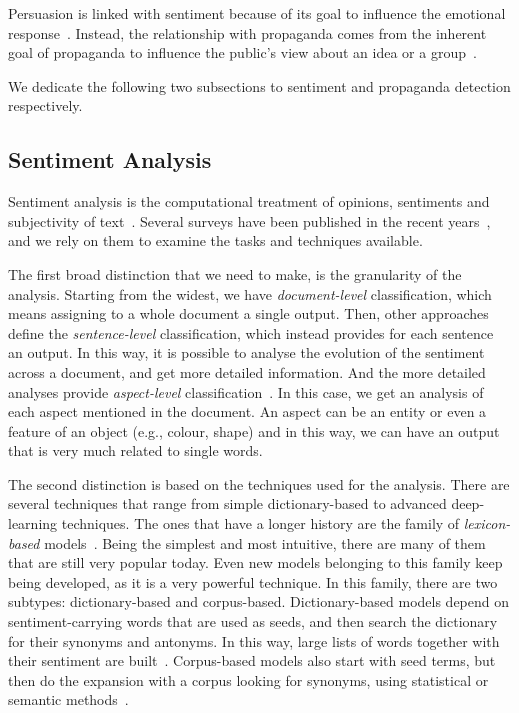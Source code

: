 Persuasion is linked with sentiment because of its goal to influence the emotional response~\citep{gatti2014sentiment,rocklage2018persuasion,petty2015emotion,desteno2004discrete}.
Instead, the relationship with propaganda comes from the inherent goal of propaganda to influence the public's view about an idea or a group~\citep{bernays,jowett2018propaganda}.

We dedicate the following two subsections to sentiment and propaganda detection respectively.

\subsection{\statusgreen Sentiment Analysis}
\label{sec:lit_sentiment}


Sentiment analysis is the computational treatment of opinions, sentiments and subjectivity of text~\citep{medhat2014sentiment}.
Several surveys have been published in the recent years~\citep{liu2010sentiment,medhat2014sentiment,wankhade2022survey}, and we rely on them to examine the tasks and techniques available.



The first broad distinction that we need to make, is the granularity of the analysis.
Starting from the widest, we have \emph{document-level} classification, which means assigning to a whole document a single output.
Then, other approaches define the \emph{sentence-level} classification, which instead provides for each sentence an output. In this way, it is possible to analyse the evolution of the sentiment across a document, and get more detailed information.
And the more detailed analyses provide \emph{aspect-level} classification~\citep{zhang2022survey}. In this case, we get an analysis of each aspect mentioned in the document. An aspect can be an entity or even a feature of an object (e.g., colour, shape) and in this way, we can have an output that is very much related to single words.

The second distinction is based on the techniques used for the analysis. There are several techniques that range from simple dictionary-based to advanced deep-learning techniques.
The ones that have a longer history are the family of \emph{lexicon-based} models~\citep{taboada2011lexicon}. Being the simplest and most intuitive, there are many of them that are still very popular today. Even new models belonging to this family keep being developed, as it is a very powerful technique.
In this family, there are two subtypes: dictionary-based and corpus-based.
Dictionary-based models depend on sentiment-carrying words that are used as seeds, and then search the dictionary for their synonyms and antonyms. In this way, large lists of words together with their sentiment are built~\citep{okango2022dictionary,hardeniya2016dictionary}.
Corpus-based models also start with seed terms, but then do the expansion with a corpus looking for synonyms, using statistical or semantic methods~\citep{darwich2019corpus,rice2021corpus}.

